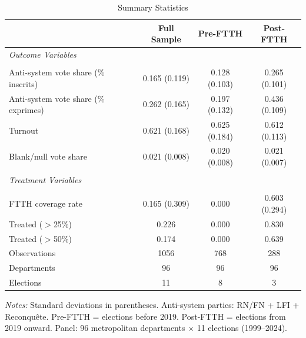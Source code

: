 \begin{table}[htbp]
\centering
\caption{Summary Statistics}
\label{tab:sumstats}
\begin{tabular}{lccc}
\hline\hline
& Full Sample & Pre-FTTH & Post-FTTH \\
\hline
\emph{Outcome Variables} &  &  &  \\
 &  &  &  \\
Anti-system vote share (\% inscrits) & 0.165 (0.119) & 0.128 (0.103) & 0.265 (0.101) \\
Anti-system vote share (\% exprimes) & 0.262 (0.165) & 0.197 (0.132) & 0.436 (0.109) \\
Turnout & 0.621 (0.168) & 0.625 (0.184) & 0.612 (0.113) \\
Blank/null vote share & 0.021 (0.008) & 0.020 (0.008) & 0.021 (0.007) \\
 &  &  &  \\
\emph{Treatment Variables} &  &  &  \\
 &  &  &  \\
FTTH coverage rate & 0.165 (0.309) & 0.000 & 0.603 (0.294) \\
Treated ($>$25\%) & 0.226 & 0.000 & 0.830 \\
Treated ($>$50\%) & 0.174 & 0.000 & 0.639 \\
\hline
Observations & 1056 & 768 & 288 \\
Departments & 96 & 96 & 96 \\
Elections & 11 & 8 & 3 \\
\hline\hline
\end{tabular}
\begin{minipage}{0.9\textwidth}
\vspace{0.3em}
\footnotesize \emph{Notes:} Standard deviations in parentheses. Anti-system parties: RN/FN + LFI + Reconqu\^ete. Pre-FTTH = elections before 2019. Post-FTTH = elections from 2019 onward. Panel: 96 metropolitan departments $\times$ 11 elections (1999--2024).
\end{minipage}
\end{table}
